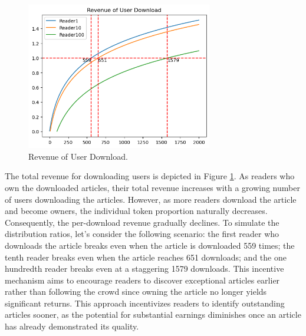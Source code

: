 \documentclass[lettersize,journal]{IEEEtran}
\begin{document}
\begin{figure}[h]
  \centering
  \includegraphics[width=3.2in]{assets/revenue-user-download.png}
  \caption{Revenue of User Download.}
  \label{fig:revenue-user-download}
\end{figure}

The total revenue for downloading users is depicted in Figure \ref{fig:revenue-user-download}. As readers who own the downloaded articles, their total revenue increases with a growing number of users downloading the articles. However, as more readers download the article and become owners, the individual token proportion naturally decreases. Consequently, the per-download revenue gradually declines.
To simulate the distribution ratios, let's consider the following scenario: the first reader who downloads the article breaks even when the article is downloaded 559 times; the tenth reader breaks even when the article reaches 651 downloads; and the one hundredth reader breaks even at a staggering 1579 downloads. This incentive mechanism aims to encourage readers to discover exceptional articles earlier rather than following the crowd since owning the article no longer yields significant returns.
This approach incentivizes readers to identify outstanding articles sooner, as the potential for substantial earnings diminishes once an article has already demonstrated its quality.
\end{document}
